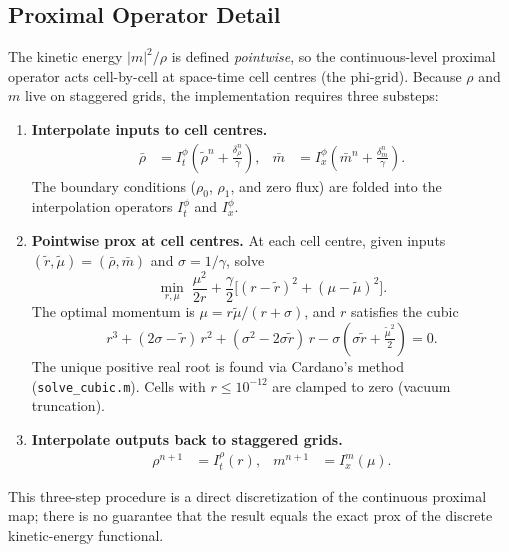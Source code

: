 \documentclass[11pt]{article}
\newcommand{\rhoO}{\rho_0}
\newcommand{\rhoT}{\rho_1}
\begin{document}
\subsection{Proximal Operator Detail}

The kinetic energy $|m|^2/\rho$ is defined \emph{pointwise}, so the
continuous-level proximal operator acts cell-by-cell at space-time cell
centres (the phi-grid).
Because $\rho$ and $m$ live on staggered grids, the implementation
requires three substeps:

\begin{enumerate}
  \item \textbf{Interpolate inputs to cell centres.}
    \begin{align*}
      \bar\rho &= I_t^\phi\!\left(\tilde\rho^n + \tfrac{\delta_\rho^n}{\gamma}\right),
      &
      \bar m   &= I_x^\phi\!\left(\bar m^n + \tfrac{\delta_m^n}{\gamma}\right).
    \end{align*}
    The boundary conditions ($\rhoO$, $\rhoT$, and zero flux) are folded
    into the interpolation operators $I_t^\phi$ and $I_x^\phi$.

  \item \textbf{Pointwise prox at cell centres.}
    At each cell centre, given inputs $(\tilde r, \tilde\mu) = (\bar\rho, \bar m)$
    and $\sigma = 1/\gamma$, solve
    \begin{equation}
      \min_{r,\mu}\; \frac{\mu^2}{2r}
      + \frac{\gamma}{2}\bigl[(r-\tilde r)^2 + (\mu-\tilde\mu)^2\bigr].
    \end{equation}
    The optimal momentum is $\mu = r\tilde\mu/(r+\sigma)$, and $r$ satisfies
    the cubic
    \begin{equation}\label{eq:cubic}
      r^3 + (2\sigma - \tilde r)\,r^2
          + (\sigma^2 - 2\sigma\tilde r)\,r
          - \sigma\!\left(\sigma\tilde r + \tfrac{\tilde\mu^2}{2}\right) = 0.
    \end{equation}
    The unique positive real root is found via Cardano's method
    (\texttt{solve\_cubic.m}).
    Cells with $r\le 10^{-12}$ are clamped to zero (vacuum truncation).

  \item \textbf{Interpolate outputs back to staggered grids.}
    \begin{align*}
      \rho^{n+1} &= I_t^\rho(r),
      &
      m^{n+1} &= I_x^m(\mu).
    \end{align*}
\end{enumerate}

\noindent
This three-step procedure is a direct discretization of the continuous
proximal map; there is no guarantee that the result equals the exact prox
of the discrete kinetic-energy functional.
\end{document}
